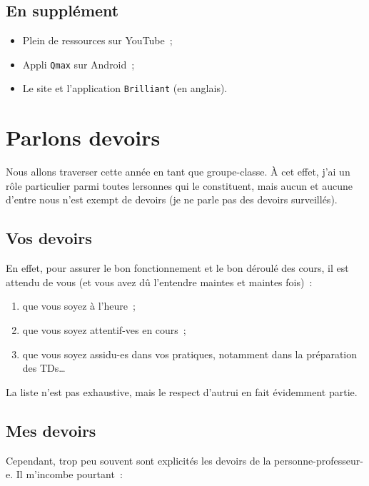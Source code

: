 \documentclass[a4paper, 10pt, final, garamond]{book}
\begin{document}
\subsection{En supplément}

\begin{itemize}
	\item Plein de ressources sur YouTube~;
	\item Appli \texttt{Qmax} sur Android~;
	\item Le site et l'application \texttt{Brilliant} (en anglais).
\end{itemize}

\section{Parlons devoirs}

Nous allons traverser cette année en tant que groupe-classe. À cet effet, j'ai
un rôle particulier parmi toutes lersonnes qui le constituent, mais aucun et
aucune d'entre nous n'est exempt de devoirs (je ne parle pas des devoirs
surveillés).

\subsection{Vos devoirs}

En effet, pour assurer le bon fonctionnement et le bon déroulé des cours, il est
attendu de vous (et vous avez dû l'entendre maintes et maintes fois)~:

\begin{enumerate}
	\item que vous soyez à l'heure~;
	\item que vous soyez attentif-ves en cours~;
	\item que vous soyez assidu-es dans vos pratiques, notamment dans la
	      préparation des TDs…
\end{enumerate}

La liste n'est pas exhaustive, mais le respect d'autrui en fait évidemment
partie.

\subsection{Mes devoirs}

Cependant, trop peu souvent sont explicités les devoirs de la
personne-professeur-e. Il m'incombe pourtant~:
\end{document}
